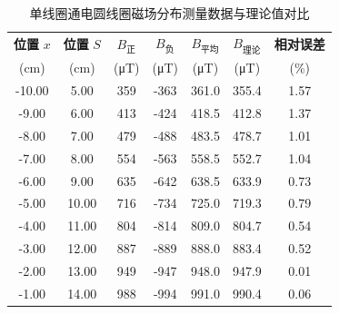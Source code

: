 \documentclass{../../templates/Report}%
\begin{document}
\begin{fullreportonly}
    \begin{table}[H]
        \centering
        \caption{单线圈通电圆线圈磁场分布测量数据与理论值对比}
        \label{tab:single_coil}
        \small
        \begin{tabular}{c c c c c c c}
            \toprule
            \textbf{位置} $x$ & \textbf{位置} $S$ & $B_{\text{正}}$      & $B_{\text{负}}$      & $B_{\text{平均}}$     & $B_{\text{理论}}$     & \textbf{相对误差} \\
            (\si{cm})       & (\si{cm})       & (\si{\micro\tesla}) & (\si{\micro\tesla}) & (\si{\micro\tesla}) & (\si{\micro\tesla}) & (\%)          \\
            \midrule
            -10.00          & 5.00            & 359                 & -363                & 361.0               & 355.4               & 1.57          \\
            -9.00           & 6.00            & 413                 & -424                & 418.5               & 412.8               & 1.37          \\
            -8.00           & 7.00            & 479                 & -488                & 483.5               & 478.7               & 1.01          \\
            -7.00           & 8.00            & 554                 & -563                & 558.5               & 552.7               & 1.04          \\
            -6.00           & 9.00            & 635                 & -642                & 638.5               & 633.9               & 0.73          \\
            -5.00           & 10.00           & 716                 & -734                & 725.0               & 719.3               & 0.79          \\
            -4.00           & 11.00           & 804                 & -814                & 809.0               & 804.7               & 0.54          \\
            -3.00           & 12.00           & 887                 & -889                & 888.0               & 883.4               & 0.52          \\
            -2.00           & 13.00           & 949                 & -947                & 948.0               & 947.9               & 0.01          \\
            -1.00           & 14.00           & 988                 & -994                & 991.0               & 990.4               & 0.06          \\

\end{tabular}
\end{table}
\end{fullreportonly}
\end{document}
